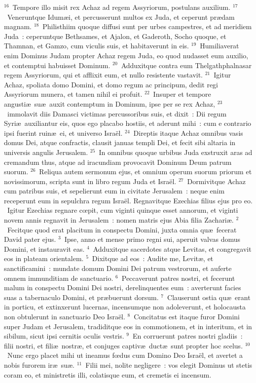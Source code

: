 ${}^{16}$~Tempore illo misit rex Achaz ad regem Assyriorum, postulans auxilium.
${}^{17}$~Veneruntque Idum\ae i, et percusserunt multos ex Juda, et ceperunt pr\ae dam magnam.
${}^{18}$~Philisthiim quoque diffusi sunt per urbes campestres, et ad meridiem Juda~: ceperuntque Bethsames, et Ajalon, et Gaderoth, Socho quoque, et Thamnan, et Gamzo, cum viculis suis, et habitaverunt in eis.
${}^{19}$~Humiliaverat enim Dominus Judam propter Achaz regem Juda, eo quod nudasset eum auxilio, et contemptui habuisset Dominum.
${}^{20}$~Adduxitque contra eum Thelgathphalnasar regem Assyriorum, qui et afflixit eum, et nullo resistente vastavit.
${}^{21}$~Igitur Achaz, spoliata domo Domini, et domo regum ac principum, dedit regi Assyriorum munera, et tamen nihil ei profuit.
${}^{22}$~Insuper et tempore angusti\ae\ su\ae\ auxit contemptum in Dominum, ipse per se rex Achaz,
${}^{23}$~immolavit diis Damasci victimas percussoribus suis, et dixit~: Dii regum Syri\ae\ auxiliantur eis, quos ego placabo hostiis, et aderunt mihi~: cum e contrario ipsi fuerint ruin\ae\ ei, et universo Isra\"el.
${}^{24}$~Direptis itaque Achaz omnibus vasis domus Dei, atque confractis, clausit januas templi Dei, et fecit sibi altaria in universis angulis Jerusalem.
${}^{25}$~In omnibus quoque urbibus Juda exstruxit aras ad cremandum thus, atque ad iracundiam provocavit Dominum Deum patrum suorum.
${}^{26}$~Reliqua autem sermonum ejus, et omnium operum suorum priorum et novissimorum, scripta sunt in libro regum Juda et Isra\"el.
${}^{27}$~Dormivitque Achaz cum patribus suis, et sepelierunt eum in civitate Jerusalem~: neque enim receperunt eum in sepulchra regum Isra\"el. Regnavitque Ezechias filius ejus pro eo.
~\lettrine[lines=10,image=true,loversize=0.05,lraise=-0.03]{I}{}gitur Ezechias regnare cœpit, cum viginti quinque esset annorum, et viginti novem annis regnavit in Jerusalem~: nomen matris ejus Abia filia Zachari\ae .
${}^{2}$~Fecitque quod erat placitum in conspectu Domini, juxta omnia qu\ae\ fecerat David pater ejus.
${}^{3}$~Ipse, anno et mense primo regni sui, aperuit valvas domus Domini, et instauravit eas.
${}^{4}$~Adduxitque sacerdotes atque Levitas, et congregavit eos in plateam orientalem.
${}^{5}$~Dixitque ad eos~: Audite me, Levit\ae , et sanctificamini~: mundate domum Domini Dei patrum vestrorum, et auferte omnem immunditiam de sanctuario.
${}^{6}$~Peccaverunt patres nostri, et fecerunt malum in conspectu Domini Dei nostri, derelinquentes eum~: averterunt facies suas a tabernaculo Domini, et pr\ae buerunt dorsum.
${}^{7}$~Clauserunt ostia qu\ae\ erant in porticu, et extinxerunt lucernas, incensumque non adoleverunt, et holocausta non obtulerunt in sanctuario Deo Isra\"el.
${}^{8}$~Concitatus est itaque furor Domini super Judam et Jerusalem, tradiditque eos in commotionem, et in interitum, et in sibilum, sicut ipsi cernitis oculis vestris.
${}^{9}$~En corruerunt patres nostri gladiis~: filii nostri, et fili\ae\ nostr\ae , et conjuges captiv\ae\ duct\ae\ sunt propter hoc scelus.
${}^{10}$~Nunc ergo placet mihi ut ineamus fœdus cum Domino Deo Isra\"el, et avertet a nobis furorem ir\ae\ su\ae .
${}^{11}$~Filii mei, nolite negligere~: vos elegit Dominus ut stetis coram eo, et ministretis illi, colatisque eum, et cremetis ei incensum.



